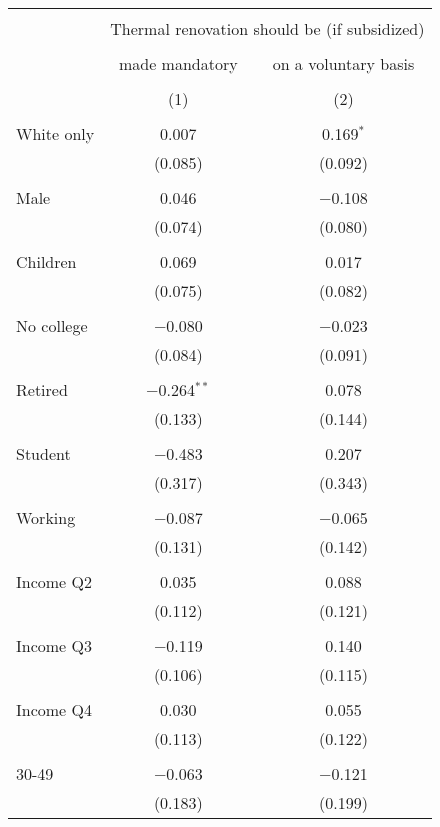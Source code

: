 
\begin{tabular}{@{\extracolsep{5pt}}lcc} 
\\[-1.8ex]\hline 
\hline \\[-1.8ex] 
 & \multicolumn{2}{c}{Thermal renovation should be (if subsidized)} \\ 
\cline{2-3} 
\\[-1.8ex] & made mandatory & on a voluntary basis \\ 
\\[-1.8ex] & (1) & (2)\\ 
\hline \\[-1.8ex] 
 White only & 0.007 & 0.169$^{*}$ \\ 
  & (0.085) & (0.092) \\ 
  & & \\ 
 Male & 0.046 & $-$0.108 \\ 
  & (0.074) & (0.080) \\ 
  & & \\ 
 Children & 0.069 & 0.017 \\ 
  & (0.075) & (0.082) \\ 
  & & \\ 
 No college & $-$0.080 & $-$0.023 \\ 
  & (0.084) & (0.091) \\ 
  & & \\ 
 Retired & $-$0.264$^{**}$ & 0.078 \\ 
  & (0.133) & (0.144) \\ 
  & & \\ 
 Student & $-$0.483 & 0.207 \\ 
  & (0.317) & (0.343) \\ 
  & & \\ 
 Working & $-$0.087 & $-$0.065 \\ 
  & (0.131) & (0.142) \\ 
  & & \\ 
 Income Q2 & 0.035 & 0.088 \\ 
  & (0.112) & (0.121) \\ 
  & & \\ 
 Income Q3 & $-$0.119 & 0.140 \\ 
  & (0.106) & (0.115) \\ 
  & & \\ 
 Income Q4 & 0.030 & 0.055 \\ 
  & (0.113) & (0.122) \\ 
  & & \\ 
 30-49 & $-$0.063 & $-$0.121 \\ 
  & (0.183) & (0.199) \\ 

\end{tabular}
